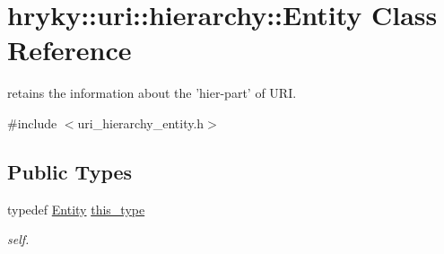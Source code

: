 \hypertarget{classhryky_1_1uri_1_1hierarchy_1_1_entity}{\section{hryky\-:\-:uri\-:\-:hierarchy\-:\-:Entity Class Reference}
\label{classhryky_1_1uri_1_1hierarchy_1_1_entity}
}


retains the information about the 'hier-\/part' of U\-R\-I.  




{\ttfamily \#include $<$uri\-\_\-hierarchy\-\_\-entity.\-h$>$}

\subsection*{Public Types}
\begin{DoxyCompactItemize}
\item 
\hypertarget{classhryky_1_1uri_1_1hierarchy_1_1_entity_a75ba54ddfefb82538bddab2df6946e4b}{typedef \hyperlink{classhryky_1_1uri_1_1hierarchy_1_1_entity}{Entity} \hyperlink{classhryky_1_1uri_1_1hierarchy_1_1_entity_a75ba54ddfefb82538bddab2df6946e4b}{this\-\_\-type}}\label{classhryky_1_1uri_1_1hierarchy_1_1_entity_a75ba54ddfefb82538bddab2df6946e4b}

\begin{DoxyCompactList}\small\item\em self. \end{DoxyCompactList}\end{DoxyCompactItemize}
